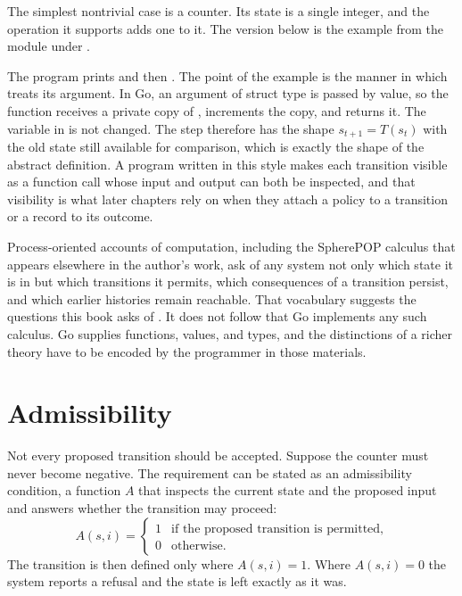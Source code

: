The simplest nontrivial case is a counter. Its state is a single integer, and the operation it supports adds one to it. The version below is the example from the module under .


The program prints  and then . The point of the example is the manner in which  treats its argument. In Go, an argument of struct type is passed by value, so the function receives a private copy of , increments the copy, and returns it. The variable  in  is not changed. The step therefore has the shape $s_{t+1} = T(s_t)$ with the old state still available for comparison, which is exactly the shape of the abstract definition. A program written in this style makes each transition visible as a function call whose input and output can both be inspected, and that visibility is what later chapters rely on when they attach a policy to a transition or a record to its outcome.

\begin{remark}
Process-oriented accounts of computation, including the SpherePOP calculus that appears elsewhere in the author's work, ask of any system not only which state it is in but which transitions it permits, which consequences of a transition persist, and which earlier histories remain reachable. That vocabulary suggests the questions this book asks of \golab{}. It does not follow that Go implements any such calculus. Go supplies functions, values, and types, and the distinctions of a richer theory have to be encoded by the programmer in those materials.
\end{remark}

\section{Admissibility}

Not every proposed transition should be accepted. Suppose the counter must never become negative. The requirement can be stated as an admissibility condition, a function $A$ that inspects the current state and the proposed input and answers whether the transition may proceed:
\[
A(s,i) =
\begin{cases}
1 & \text{if the proposed transition is permitted},\\
0 & \text{otherwise.}
\end{cases}
\]
The transition is then defined only where $A(s,i)=1$. Where $A(s,i)=0$ the system reports a refusal and the state is left exactly as it was.

